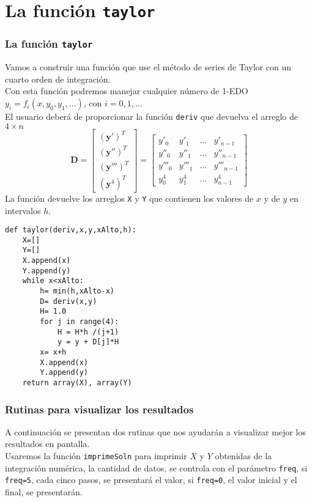 \section{La función \texttt{taylor}}
\begin{frame}
\frametitle{La función \texttt{taylor}}
Vamos a construir una función que use el método de series de Taylor con un cuarto orden de integración.
\\
\medskip
Con esta función podremos manejar cualquier número de 1-EDO $y_{i} = f_{i} (x, y_{0},y_{1},\ldots)$, con $i=0,1,\ldots$
\\
\medskip
El usuario deberá de proporcionar la función \texttt{deriv} que devuelva el arreglo de $4 \times n$
\[ \mathbf{D} = 
\begin{bmatrix}
(\mathbf{y}')^{T} \\
(\mathbf{y}'')^{T} \\
(\mathbf{y}''')^{T} \\
(\mathbf{y}^{4})^{T}
\end{bmatrix} =
\begin{bmatrix}
y'_{0} & y'_{1} & \ldots & y'_{n-1} \\
y''_{0} & y''_{1} & \ldots & y''_{n-1} \\
y'''_{0} & y'''_{1} & \ldots & y'''_{n-1} \\
y^{4}_{0} & y^{4}_{1} & \ldots & y^{4}_{n-1}
\end{bmatrix} \]
La función devuelve los arreglos \texttt{X} y \texttt{Y} que contienen los valores de $x$ y de $y$ en intervalos $h$.
\end{frame}
\begin{frame}[fragile]
\begin{lstlisting}
def taylor(deriv,x,y,xAlto,h):
    X=[]
    Y=[]
    X.append(x)
    Y.append(y)
    while x<xAlto:
        h= min(h,xAlto-x)
        D= deriv(x,y)
        H= 1.0
        for j in range(4):
            H = H*h /(j+1)
            y = y + D[j]*H
        x= x+h
        X.append(x)
        Y.append(y)
    return array(X), array(Y)
\end{lstlisting}
\end{frame}
\begin{frame}
\frametitle{Rutinas para visualizar los resultados}
A continuación se presentan dos rutinas que nos ayudarán a visualizar mejor los resultados en pantalla.
\\
\medskip
Usaremos la función \texttt{imprimeSoln} para imprimir $X$ y $Y$ obtenidas de la integración numérica, la cantidad de datos, se controla con el parámetro \texttt{freq}, si \texttt{freq=5}, cada cinco pasos, se presentará el valor, si \texttt{freq=0}, el valor inicial y el final, se presentarán.
\end{frame}
